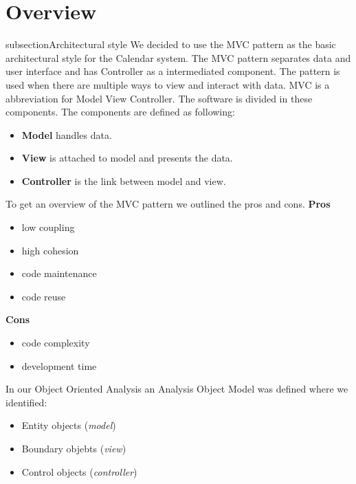 \section{Overview}

subsection{Architectural style}
\newline
 We decided to use the MVC pattern as the basic architectural style for the Calendar system.
\newline
\newline
The MVC pattern separates data and user interface and has Controller as a intermediated component. The pattern is used when there are multiple ways to view and interact with data.
\newline
\newline
MVC is a abbreviation for Model View Controller. The software is divided in these components. The components are defined as following:
\begin{itemize}
	\item \textbf{Model} handles data.
	\item \textbf{View} is attached to model and presents the data.
	\item \textbf{Controller} is the link between model and view. 
\end{itemize}
\bigskip


To get an overview of the MVC pattern we outlined the pros and cons.
\newline
\textbf{Pros}
\begin{itemize}
	\item low coupling
	\item high cohesion
	\item code maintenance
	\item code reuse
\end{itemize}
\textbf{Cons}
\begin{itemize}
	\item code complexity
	\item development time
\end{itemize}

\newpage
In our Object Oriented Analysis an Analysis Object Model was defined where we identified:
\begin{itemize}
	\item Entity objects (\emph{model})
	\item Boundary objebts (\emph{view})
	\item Control objects (\emph{controller})
\end{itemize}

